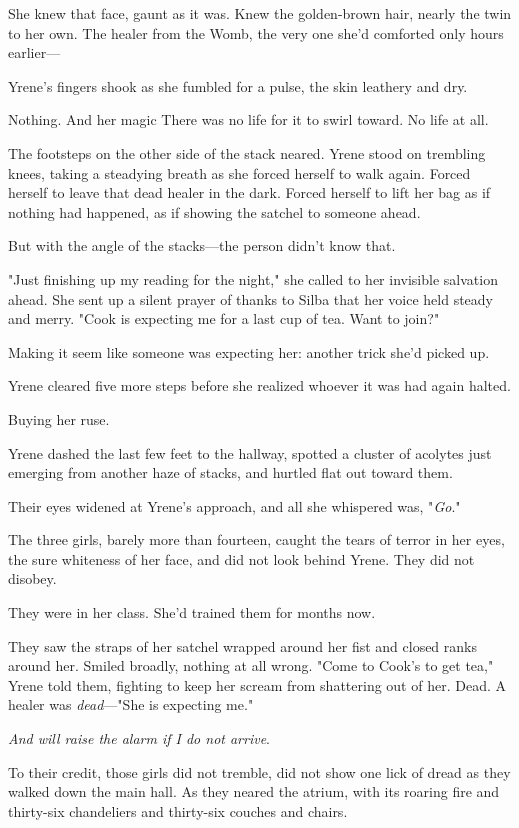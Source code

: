 She knew that face, gaunt as it was. Knew the golden-brown hair, nearly the twin to her own. The healer from the Womb, the very one she'd comforted only hours earlier---

Yrene's fingers shook as she fumbled for a pulse, the skin leathery and dry.

Nothing. And her magic  There was no life for it to swirl toward. No life at all.

The footsteps on the other side of the stack neared. Yrene stood on trembling knees, taking a steadying breath as she forced herself to walk again. Forced herself to leave that dead healer in the dark. Forced herself to lift her bag as if nothing had happened, as if showing the satchel to someone ahead.

But with the angle of the stacks---the person didn't know that.

"Just finishing up my reading for the night," she called to her invisible salvation ahead. She sent up a silent prayer of thanks to Silba that her voice held steady and merry. "Cook is expecting me for a last cup of tea. Want to join?"

Making it seem like someone was expecting her: another trick she'd picked up.

Yrene cleared five more steps before she realized whoever it was had again halted.

Buying her ruse.

Yrene dashed the last few feet to the hallway, spotted a cluster of acolytes just emerging from another haze of stacks, and hurtled flat out toward them.

Their eyes widened at Yrene's approach, and all she whispered was, "\emph{Go}."

The three girls, barely more than fourteen, caught the tears of terror in her eyes, the sure whiteness of her face, and did not look behind Yrene. They did not disobey.

They were in her class. She'd trained them for months now.

They saw the straps of her satchel wrapped around her fist and closed ranks around her. Smiled broadly, nothing at all wrong. "Come to Cook's to get tea," Yrene told them, fighting to keep her scream from shattering out of her. Dead. A healer was \emph{dead}---"She is expecting me."

\emph{And will raise the alarm if I do not arrive}.

To their credit, those girls did not tremble, did not show one lick of dread as they walked down the main hall. As they neared the atrium, with its roaring fire and thirty-six chandeliers and thirty-six couches and chairs.

